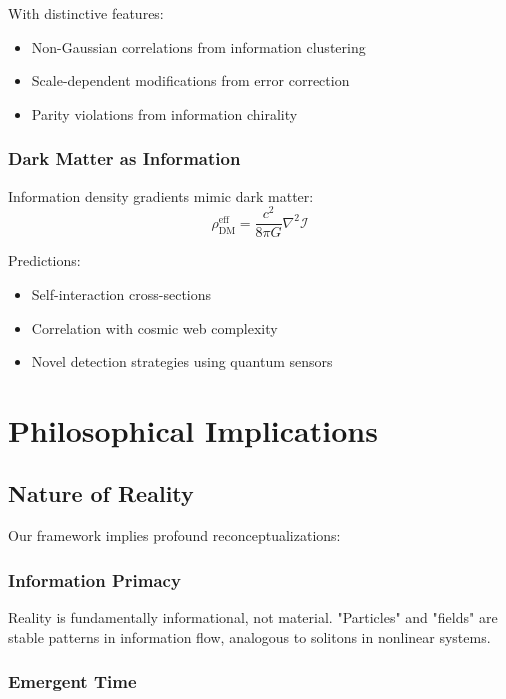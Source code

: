 \documentclass[11pt,a4paper]{article}
\theoremstyle{definition}
\begin{document}
With distinctive features:
\begin{itemize}
\item Non-Gaussian correlations from information clustering
\item Scale-dependent modifications from error correction
\item Parity violations from information chirality
\end{itemize}

\subsubsection{Dark Matter as Information}

Information density gradients mimic dark matter:
\begin{equation}
\rho_{\text{DM}}^{\text{eff}} = \frac{c^2}{8\pi G}\nabla^2\mathcal{I}
\end{equation}

Predictions:
\begin{itemize}
\item Self-interaction cross-sections
\item Correlation with cosmic web complexity
\item Novel detection strategies using quantum sensors
\end{itemize}

\section{Philosophical Implications}

\subsection{Nature of Reality}

Our framework implies profound reconceptualizations:

\subsubsection{Information Primacy}

Reality is fundamentally informational, not material. "Particles" and "fields" are stable patterns in information flow, analogous to solitons in nonlinear systems.

\subsubsection{Emergent Time}
\end{document}

